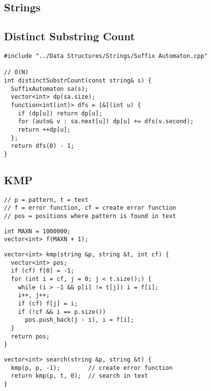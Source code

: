 \documentclass[twoside]{article}
\begin{document}
\begin{multicols*}{2}
\sectionfont{\bfseries\sffamily\centering\Huge}
\vspace{1em}
\section*{Strings}
\vspace{3em}
\subsectionfont{\large\bfseries\sffamily\underline}
\subsection*{Distinct Substring Count}
\begin{verbatim}
#include "../Data Structures/Strings/Suffix Automaton.cpp"

// O(N)
int distinctSubstrCount(const string& s) {
  SuffixAutomaton sa(s);
  vector<int> dp(sa.size);
  function<int(int)> dfs = [&](int u) {
    if (dp[u]) return dp[u];
    for (auto& v : sa.next[u]) dp[u] += dfs(v.second);
    return ++dp[u];
  };
  return dfs(0) - 1;
}
\end{verbatim}

\subsectionfont{\large\bfseries\sffamily\underline}
\subsection*{KMP}
\begin{verbatim}
// p = pattern, t = text
// f = error function, cf = create error function
// pos = positions where pattern is found in text
\end{verbatim}
\vspace{-12pt}
\begin{verbatim}
int MAXN = 1000000;
vector<int> f(MAXN + 1);
\end{verbatim}
\vspace{-12pt}
\begin{verbatim}
vector<int> kmp(string &p, string &t, int cf) {
  vector<int> pos;
  if (cf) f[0] = -1;
  for (int i = cf, j = 0; j < t.size();) {
    while (i > -1 && p[i] != t[j]) i = f[i];
    i++, j++;
    if (cf) f[j] = i;
    if (!cf && i == p.size())
      pos.push_back(j - i), i = f[i];
  }
  return pos;
}
\end{verbatim}
\vspace{-12pt}
\begin{verbatim}
vector<int> search(string &p, string &t) {
  kmp(p, p, -1);        // create error function
  return kmp(p, t, 0);  // search in text
}
\end{verbatim}


\end{multicols*}
\end{document}
